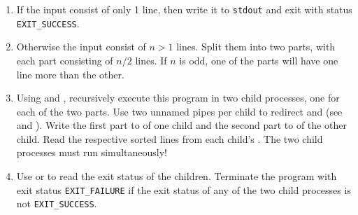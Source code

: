 \begin{enumerate}
\item If the input consist of only 1 line,
then write it to \texttt{stdout} and exit with status \verb|EXIT_SUCCESS|.
\item Otherwise the input consist of $n>1$ lines.
Split them into two parts, with each part consisting of $n/2$ lines.
If $n$ is odd, one of the parts will have one line more than the other.
\item Using  and ,
recursively execute this program in two child processes,
one for each of the two parts.
Use two unnamed pipes per child
to redirect  and 
(see  and ).
Write the first part to  of one child
and the second part to  of the other child.
Read the respective sorted lines from each child's .
The two child processes must run simultaneously!

\item Use  or 
to read the exit status of the children.
Terminate the program with exit status \verb|EXIT_FAILURE|
if the exit status of any of the two child processes is not \verb|EXIT_SUCCESS|.


\end{enumerate}

